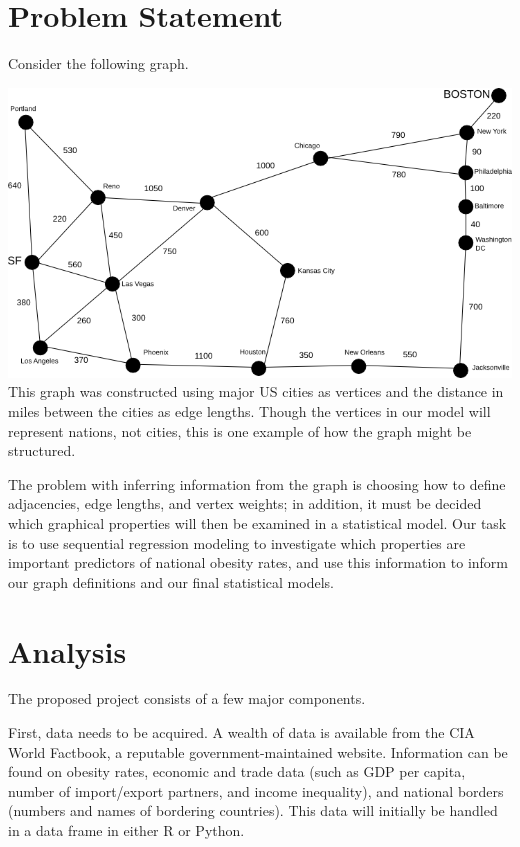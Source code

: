 \documentclass[oneside,12pt]{report}
\begin{document}
\chapter{Problem Statement}

Consider the following graph.

\includegraphics[width=\textwidth]{graph_map_of_us.png}\\

This graph was constructed using major US cities as vertices and the distance in miles between the cities as edge lengths. Though the vertices in our model will represent nations, not cities, this is one example of how the graph might be structured.

The problem with inferring information from the graph is choosing how to define adjacencies, edge lengths, and vertex weights; in addition,
it must be decided which graphical properties will then be examined in a statistical model. Our task is to use sequential regression modeling to
investigate which properties are important predictors of national obesity rates, and use this information to inform our graph definitions and our final statistical models.

\chapter{Analysis}

The proposed project consists of a few major components.

First, data needs to be acquired. A wealth of data is available from the CIA World Factbook, a reputable government-maintained website. Information can be
found on obesity rates, economic and trade data (such as GDP per capita, number of import/export partners, and income inequality), and national borders (numbers and names of bordering countries). This data will initially be handled in a data frame in either R or Python.
\end{document}
